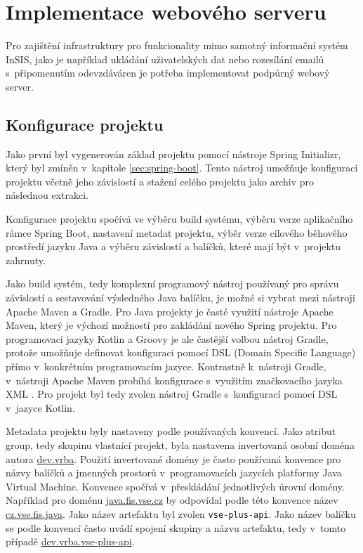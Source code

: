 \chapter{Implementace webového serveru}

Pro zajištění infrastruktury pro funkcionality mimo samotný informační systém InSIS, jako je například ukládání uživatelských dat nebo rozesílání emailů s~připomenutím odevzdáváren je potřeba implementovat podpůrný webový server. 

\section{Konfigurace projektu}

Jako první byl vygenerován základ projektu pomocí nástroje Spring Initializr, který byl zmíněn v~kapitole \ref{sec:spring-boot}. Tento nástroj umožňuje konfiguraci projektu včetně jeho závislostí a stažení celého projektu jako archiv pro následnou extrakci.

Konfigurace projektu spočívá ve výběru build systému, výběru verze aplikačního rámce Spring Boot, nastavení metadat projektu, výběr verze cílového běhového prostředí jazyku Java a výběru závislostí a balíčků, které mají být v~projektu zahrnuty.

Jako build systém, tedy komplexní programový nástroj používaný pro správu závislostí a sestavování výsledného Java balíčku, je možné si vybrat mezi nástroji Apache Maven a Gradle. Pro Java projekty je časté využití nástroje Apache Maven, který je výchozí možností pro zakládání nového Spring projektu. Pro programovací jazyky Kotlin a Groovy je ale častější volbou nástroj Gradle, protože umožňuje definovat konfiguraci pomocí DSL (Domain Specific Language) přímo v~konkrétním programovacím jazyce. Kontrastně k~nástroji Gradle, v~nástroji Apache Maven probíhá konfigurace s~využitím značkovacího jazyka XML \cite{pom_reference}. Pro projekt byl tedy zvolen nástroj Gradle s~konfigurací pomocí DSL v~jazyce Kotlin.

Metadata projektu byly nastaveny podle používaných konvencí. Jako atribut group, tedy skupinu vlastnící projekt, byla nastavena invertovaná osobní doména autora \url{dev.vrba}. Použití invertované domény je často používaná konvence pro názvy balíčků a jmenných prostorů v~programovacích jazycích platformy Java Virtual Machine. Konvence spočívá v~přeskládání jednotlivých úrovní domény. Například pro doménu \url{java.fis.vse.cz} by odpovídal podle této konvence název \url{cz.vse.fis.java}. Jako název artefaktu byl zvolen \verb|vse-plus-api|. Jako název balíčku se podle konvencí často uvádí spojení skupiny a názvu artefaktu, tedy v~tomto případě \url{dev.vrba.vse-plus-api}. 

